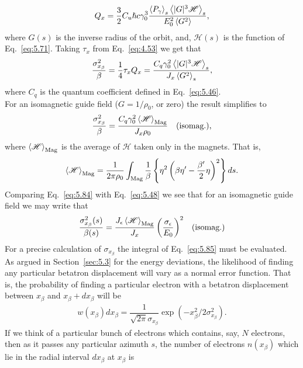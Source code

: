 \documentclass[../sands-adaptation.tex]{subfiles}
\begin{document}
\begin{align}
	Q_x = \dfrac{3}{2} C_u \hslash c \gamma_0^3 \dfrac{\left< P_\gamma \right>_s \left< |G|^3\mathscr{H} \right>_s}{E_0^2 \left< G^2 \right>},
\end{align}
where $G(s)$ is the inverse radius of the orbit, and, $\mathscr{H}(s)$ is the function of Eq.~\eqref{eq:5.71}. Taking $\tau_x$ from Eq.~\eqref{eq:4.53} we get that
\begin{align}
	\dfrac{\sigma_{x_\beta}^2}{\beta} = \dfrac{1}{4} \tau_x Q_x = \dfrac{C_q \gamma_0^2 \left< |G|^3\mathscr{H} \right>_s}{J_x \left< G^2 \right>_s},
\end{align}
where $C_q$ is the quantum coefficient defined in Eq.~\eqref{eq:5.46}.\\
For an isomagnetic guide field ($G = 1/\rho_0$, or zero) the result simplifies to
\begin{align}\label{eq:5.84}
	\dfrac{\sigma_{x_\beta}^2}{\beta} =\dfrac{C_q \gamma_0^2 \left< \mathscr{H} \right>_\text{Mag}}{J_x \rho_0} && \text{(isomag.),}
\end{align}
where $\left< \mathscr{H} \right>_\text{Mag}$ is the average of $\mathscr{H}$ taken only in the magnets.
 That is,
\begin{align}\label{eq:5.85}
	\left< \mathscr{H} \right>_\text{Mag} = \dfrac{1}{2\pi\rho_0} \int_\text{Mag} \dfrac{1}{\beta}\left\lbrace \eta^2 \left( \beta\eta' - \dfrac{\beta'}{2} \eta \right)^2 \right\rbrace ds.
\end{align}
Comparing Eq.~\eqref{eq:5.84} with Eq.~\eqref{eq:5.48} we see that for an isomagnetic guide
field we may write that
\begin{align}\label{eq:5.86}
	\dfrac{\sigma_{x_\beta}^2(s)}{\beta(s)} =  \dfrac{J_\epsilon \left< \mathscr{H} \right>_\text{Mag}}{J_x} \left( \dfrac{\sigma_\epsilon}{E_0} \right)^2 && \text{(isomag.)}
\end{align}
For a precise calculation of $\sigma_{x_\beta}$ the integral of Eq.~\eqref{eq:5.85} must be evaluated.\\
As argued in Section~\ref{sec:5.3} for the energy deviations, the likelihood of finding
any particular betatron displacement will vary as a normal error function. That is, the probability of finding a particular electron with a betatron displacement between $x_\beta$ and $x_\beta + dx_\beta$ will be
\begin{align}
	w(x_\beta)dx_\beta = \dfrac{1}{\sqrt{2\pi} \sigma_{x_\beta}} \exp\left( -x_\beta^2/2\sigma_{x_\beta}^2 \right).
\end{align}
If we think of a particular bunch of electrons which contains, say, $N$ electrons, then as it passes any particular azimuth $s$, the number of electrons $n(x_\beta)$ which lie in the radial interval $dx_\beta$ at $x_\beta$ is
\end{document}
